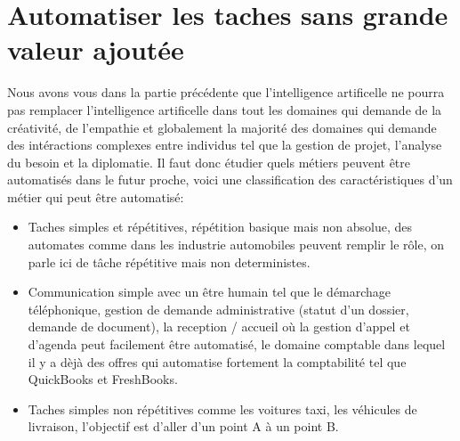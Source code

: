 
    \chapter{Automatiser les taches sans grande valeur ajoutée}

        Nous avons vous dans la partie précédente que l'intelligence artificelle
        ne pourra pas remplacer l'intelligence artificelle dans tout 
        les domaines qui demande de la créativité, de l'empathie et globalement 
        la majorité des domaines qui demande des intéractions complexes entre 
        individus tel que la gestion de projet, l'analyse du besoin et la 
        diplomatie. Il faut donc étudier quels métiers peuvent être automatisés dans le futur proche,
        voici une classification des caractéristiques d'un métier qui peut être automatisé:
        \newline
        \begin{itemize}
            \item Taches simples et répétitives, répétition basique mais non absolue, des automates 
            comme dans les industrie automobiles peuvent remplir le rôle, on parle ici de tâche 
            répétitive mais non deterministes.
            \newline

            \item Communication simple avec un être humain tel que le démarchage téléphonique,
            gestion de demande administrative (statut d'un dossier, demande de document), 
            la reception / accueil où la gestion d'appel et d'agenda peut facilement être automatisé,
            le domaine comptable dans lequel il y a dèjà des offres qui automatise fortement 
            la comptabilité tel que QuickBooks et FreshBooks.
            \newline

            \item Taches simples non répétitives comme 
            les voitures taxi, les véhicules de livraison, l'objectif est d'aller d'un point A à 
            un point B. \newline
        \end{itemize}
        
